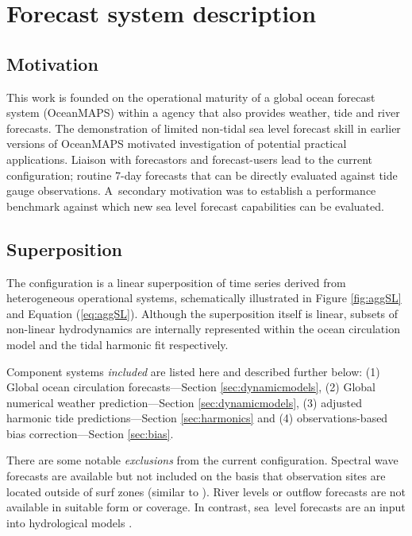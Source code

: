 \section{Forecast system description}
\subsection{Motivation}
This work is founded on the operational maturity of a global ocean forecast system (OceanMAPS) within a agency that also provides weather, tide and river forecasts.
The demonstration of limited non-tidal sea level forecast skill in earlier versions of OceanMAPS \citep{Taylor:2010ud} motivated investigation of potential practical applications. 
Liaison with forecastors and forecast-users lead to the current configuration; routine 7-day forecasts that can be directly evaluated against tide gauge observations.
A~secondary motivation was to establish a performance benchmark against which new sea level forecast capabilities can be evaluated. 

\subsection{Superposition}
\label{sec:concept}
The configuration is a linear superposition of time series derived from heterogeneous operational systems, schematically illustrated in Figure \ref{fig:aggSL} and Equation (\ref{eq:aggSL}).  
Although the superposition itself is linear, subsets of non-linear hydrodynamics are internally represented within the ocean circulation model  and the tidal harmonic fit respectively.

Component systems \textit{included} are listed here and described further below:
(1) Global ocean circulation forecasts---Section \ref{sec:dynamicmodels}, 
(2) Global numerical weather prediction---Section \ref{sec:dynamicmodels}, 
(3) adjusted harmonic tide predictions---Section \ref{sec:harmonics} and 
(4) observations-based bias correction---Section \ref{sec:bias}.

There are some notable \textit{exclusions} from the current configuration.
Spectral wave forecasts are available but not included on the basis that observation sites are located outside of surf zones (similar to  \citep{Tilburg:2004cg}).
River levels or outflow forecasts are not available in suitable form or coverage. In contrast, sea~level forecasts are an input into hydrological models \citep{Taylor:2011ud}.  

